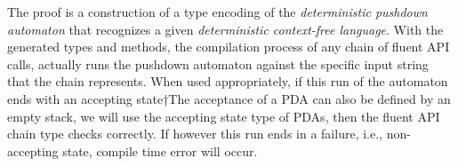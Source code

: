 The proof is a construction of a \Java type encoding of
  the \emph{deterministic pushdown automaton} that recognizes
  a given \emph{deterministic context-free language}.
With the generated types and methods, the compilation process of
  any chain of fluent API calls, actually runs the pushdown automaton against the
  specific input string that the chain represents.
When used appropriately, if this run of the automaton ends with an accepting state†{The acceptance of a PDA can also be defined by an empty stack, we will use the accepting state type of PDAs},
  then the fluent API chain type checks correctly.
If however this run ends in a failure, i.e., non-accepting state,
  compile time error will occur.


